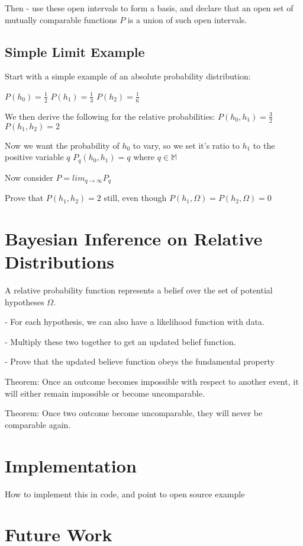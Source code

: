 \documentclass[twoside]{article}
\begin{document}
Then - use these open intervals to form a basis, and declare that an open set of mutually comparable functions \(P\) is a union of such open intervals.

\subsection{Simple Limit Example}

Start with a simple example of an absolute probability distribution:

\(P(h_0) = \frac{1}{2}\)
\(P(h_1) = \frac{1}{3}\)
\(P(h_2) = \frac{1}{6}\)

We then derive the following for the relative probabilities:
\(P(h_0, h_1) = \frac{3}{2}\)
\(P(h_1, h_2) = 2\)

Now we want the probability of \(h_0\) to vary, so we set it's ratio to \(h_1\) to the positive variable \(q\)
\(P_{q}(h_0, h_1) = q\) where \(q \in \mathbb{M}\)

Now consider \(P = lim_{q \rightarrow \infty} P_q\)

Prove that \(P(h_1, h_2) = 2\) still, even though \(P(h_1, \Omega) = P(h_2, \Omega) = 0\)


\section{Bayesian Inference on Relative Distributions}

A relative probability function represents a belief over the set of potential hypotheses \(\Omega\).

- For each hypothesis, we can also have a likelihood function with data.

- Multiply these two together to get an updated belief function.

- Prove that the updated believe function obeys the fundamental property

Theorem: Once an outcome becomes impossible with respect to another event, it will either remain impossible or become uncomparable.

Theorem: Once two outcome  become uncomparable, they will never be comparable again.

\section{Implementation}

How to implement this in code, and point to open source example

\section{Future Work}
\end{document}
